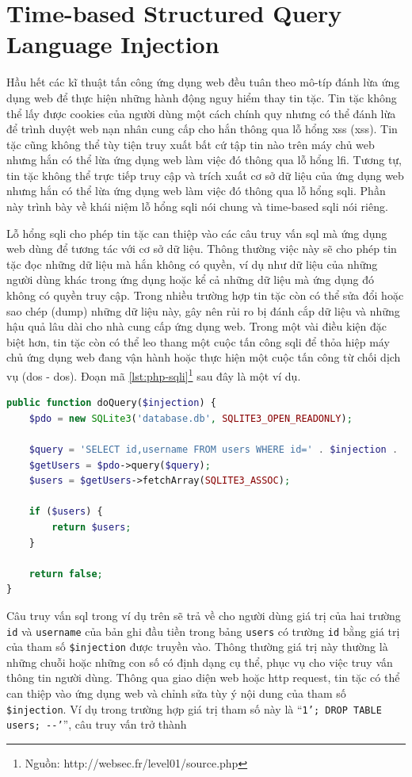 \section{Time-based Structured Query Language Injection}
Hầu hết các kĩ thuật tấn công ứng dụng web đều tuân theo mô-típ đánh lừa ứng dụng web để thực hiện những hành động nguy hiểm thay tin tặc. Tin tặc không thể lấy được cookies của người dùng một cách chính quy nhưng có thể đánh lừa để trình duyệt web nạn nhân cung cấp cho hắn thông qua lỗ hổng \acrlong{xss} (\acrshort{xss}). Tin tặc cũng không thể tùy tiện truy xuất bất cứ tập tin nào trên máy chủ web nhưng hắn có thể lừa ứng dụng web làm việc đó thông qua lỗ hổng \acrshort{lfi}. Tương tự, tin tặc không thể trực tiếp truy cập và trích xuất cơ sở dữ liệu của ứng dụng web nhưng hắn có thể lừa ứng dụng web làm việc đó thông qua lỗ hổng \acrfull{sqli}. Phần này trình bày về khái niệm lỗ hổng \acrshort{sqli} nói chung và time-based \acrshort{sqli} nói riêng.\par
Lỗ hổng \acrfull{sqli} \parencite{li2011survey,sullivan2011web} cho phép tin tặc can thiệp vào các câu truy vấn \acrshort{sql} mà ứng dụng web dùng để tương tác với cơ sở dữ liệu. Thông thường việc này sẽ cho phép tin tặc đọc những dữ liệu mà hắn không có quyền, ví dụ như dữ liệu của những người dùng khác trong ứng dụng hoặc kể cả những dữ liệu mà ứng dụng đó không có quyền truy cập. Trong nhiều trường hợp tin tặc còn có thể sửa đổi hoặc sao chép (dump) những dữ liệu này, gây nên rủi ro bị đánh cắp dữ liệu và những hậu quả lâu dài cho nhà cung cấp ứng dụng web. Trong một vài điều kiện đặc biệt hơn, tin tặc còn có thể leo thang một cuộc tấn công \acrshort{sqli} để thỏa hiệp máy chủ ứng dụng web đang vận hành hoặc thực hiện một cuộc tấn công từ chối dịch vụ (\acrshort{dos} - \acrlong{dos}). Đoạn mã \ref{lst:php-sqli}\footnote{Nguồn: http://websec.fr/level01/source.php} sau đây là một ví dụ.
\begin{lstlisting}[language=php, label={lst:php-sqli},caption={Đoạn mã PHP có lỗ hổng SQL Injection}]
public function doQuery($injection) {
    $pdo = new SQLite3('database.db', SQLITE3_OPEN_READONLY);
    
    $query = 'SELECT id,username FROM users WHERE id=' . $injection . ' LIMIT 1';
    $getUsers = $pdo->query($query);
    $users = $getUsers->fetchArray(SQLITE3_ASSOC);

    if ($users) {
        return $users;
    }

    return false;
}
\end{lstlisting}
Câu truy vấn \acrshort{sql} trong ví dụ trên sẽ trả về cho người dùng giá trị của hai trường \texttt{id} và \texttt{username} của bản ghi đầu tiền trong bảng \texttt{users} có trường \texttt{id} bằng giá trị của tham số \texttt{\$injection} được truyền vào. Thông thường giá trị này thường là những chuỗi hoặc những con số có định dạng cụ thể, phục vụ cho việc truy vấn thông tin người dùng. Thông qua giao diện web hoặc \acrshort{http} request, tin tặc có thể can thiệp vào ứng dụng web và chỉnh sửa tùy ý nội dung của tham số \texttt{\$injection}. Ví dụ trong trường hợp giá trị tham số này là ``\colorbox{gray!30}{\texttt{1'; DROP TABLE users; -{}-'}}'', câu truy vấn trở thành\\
